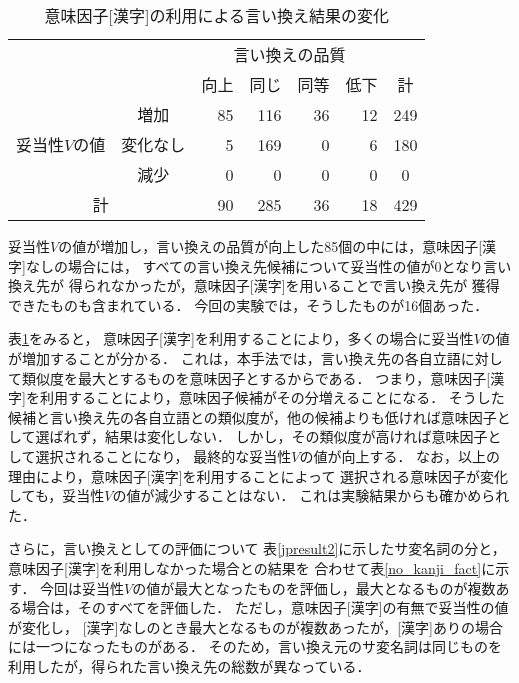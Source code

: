    \begin{table}[tb]
	\caption{\label{kanji_fact2}意味因子[漢字]の利用による言い換え結果の変化}
	\begin{center}
	 \begin{tabular}{c|c|rrrr|c}\hline
	  \multicolumn{2}{c|}{} & \multicolumn{4}{|c|}{言い換えの品質} \\ \cline {3-6}
	  \multicolumn{2}{c|}{}  & 向上&同じ&同等 & 低下 & 計\\ \hline
	  & 増加 & 85 & 116 & 36  & 12 & 249\\ 
	妥当性$V$の値  & 変化なし & 5 & 169 & 0 & 6 & 180\\ 
	  &減少    & 0 & 0 & 0 & 0 & 0\\ \hline
	\multicolumn{2}{c|}{計} & 90 & 285 & 36 & 18 & 429\\ \hline
	 \end{tabular}
	\end{center}
   \end{table}   


妥当性$V$の値が増加し，言い換えの品質が向上した85個の中には，意味因子[漢字]なしの場合には，
すべての言い換え先候補について妥当性の値が0となり言い換え先が
得られなかったが，意味因子[漢字]を用いることで言い換え先が
獲得できたものも含まれている．
今回の実験では，そうしたものが16個あった．

表\ref{kanji_fact2}をみると，
意味因子[漢字]を利用することにより，多くの場合に妥当性$V$の値が増加することが分かる．
これは，本手法では，言い換え先の各自立語に対して類似度を最大とするものを意味因子とするからである．
つまり，意味因子[漢字]を利用することにより，意味因子候補がその分増えることになる．
そうした候補と言い換え先の各自立語との類似度が，他の候補よりも低ければ意味因子として選ばれず，結果は変化しない．
しかし，その類似度が高ければ意味因子として選択されることになり，
最終的な妥当性$V$の値が向上する．
なお，以上の理由により，意味因子[漢字]を利用することによって
選択される意味因子が変化しても，妥当性$V$の値が減少することはない．
これは実験結果からも確かめられた．

さらに，言い換えとしての評価について
表\ref{jpresult2}に示したサ変名詞の分と，
意味因子[漢字]を利用しなかった場合との結果を
合わせて表\ref{no_kanji_fact}に示す．
今回は妥当性$V$の値が最大となったものを評価し，最大となるものが複数ある場合は，そのすべてを評価した．
ただし，意味因子[漢字]の有無で妥当性の値が変化し，
[漢字]なしのとき最大となるものが複数あったが，[漢字]ありの場合には一つになったものがある．
そのため，言い換え元のサ変名詞は同じものを利用したが，得られた言い換え先の総数が異なっている．

